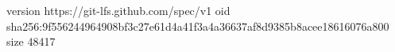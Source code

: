 version https://git-lfs.github.com/spec/v1
oid sha256:9f556244964908bf3c27e61d4a41f3a4a36637af8d9385b8acee18616076a800
size 48417
